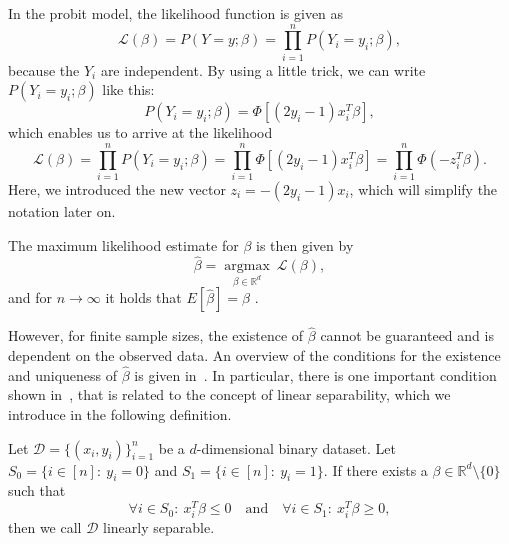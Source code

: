 In the probit model, the likelihood function is given as
\begin{equation}
    \label{eq:likelihood}
    \mathcal{L}(\beta) = P(Y=y ; \beta) = \prod_{i=1}^n P(Y_i=y_i ; \beta),
\end{equation}
because the $Y_i$ are independent. By using a little trick, we can
write $P(Y_i=y_i;\beta)$ like this:
\begin{equation*}
    P(Y_i = y_i ; \beta) = \Phi[(2y_i - 1) x_i^T \beta],
\end{equation*}
which enables us to arrive at the likelihood
\begin{equation}
    \mathcal{L}(\beta) = \prod_{i=1}^n P(Y_i=y_i ; \beta)
    = \prod_{i=1}^n \Phi[(2y_i - 1) x_i^T \beta]
    = \prod_{i=1}^n \Phi(- z_i^T \beta).
\end{equation}
Here, we introduced the new vector $z_i = - (2y_i - 1) x_i$, which will
simplify the notation later on.

The maximum likelihood estimate for $\beta$ is then given by
\begin{equation}
    \label{eq:maximum-likelihood-estimate}
    \hat{\beta} = \underset{\beta \in \mathbb{R}^d}{\operatorname{argmax}}\
    \mathcal{L}(\beta),
\end{equation}
and for $n \rightarrow \infty$ it holds that
$E[\hat{\beta}] = \beta$ \cite{regression-fahrmeir}.

However, for finite sample sizes, the existence of $\hat{\beta}$
cannot be guaranteed and is dependent on the observed data.
An overview of the conditions for the existence and uniqueness of
$\hat{\beta}$ is given in~\cite{probit-computational}.
In particular, there is one important condition shown
in~\cite{probit-existence}, that is related to the concept of
linear separability, which we introduce in the following definition.
\begin{definition}
    \label{def:linear-separability}
    Let $\mathcal{D}=\{(x_i, y_i)\}_{i=1}^n$ be a $d$-dimensional
    binary dataset.
    Let $S_0 = \{i \in [n]:\ y_i = 0\}$ and $S_1 = \{i \in [n]:\ y_i = 1\}$.
    If there exists a $\beta \in \mathbb{R}^d \setminus \{0\}$ such that
    \begin{equation*}
        \forall i \in S_0:\ x_i^T \beta \leq 0\quad \text{and}\quad \forall i \in S_1:\ x_i^T \beta \geq 0,
    \end{equation*}
    then we call $\mathcal{D}$ linearly separable.
\end{definition}

